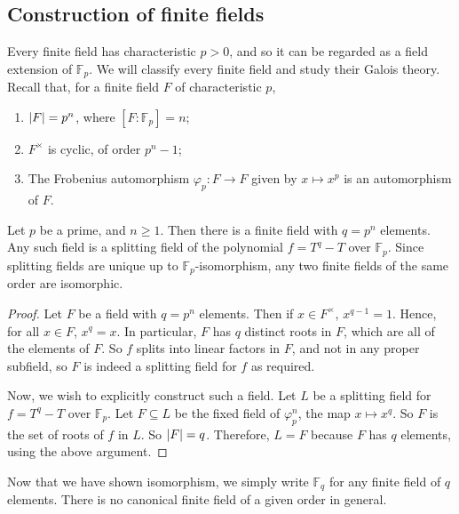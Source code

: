 \subsection{Construction of finite fields}
Every finite field has characteristic \( p > 0 \), and so it can be regarded as a field extension of \( \mathbb F_p \).
We will classify every finite field and study their Galois theory.
Recall that, for a finite field \( F \) of characteristic \( p \),
\begin{enumerate}
	\item \( \abs{F} = p^n \), where \( [F : \mathbb F_p] = n \);
	\item \( F^\times \) is cyclic, of order \( p^n - 1 \);
	\item The Frobenius automorphism \( \varphi_p \colon F \to F \) given by \( x \mapsto x^p \) is an automorphism of \( F \).
\end{enumerate}
\begin{theorem}
	Let \( p \) be a prime, and \( n \geq 1 \).
	Then there is a finite field with \( q = p^n \) elements.
	Any such field is a splitting field of the polynomial \( f = T^q - T \) over \( \mathbb F_p \).
	Since splitting fields are unique up to \( \mathbb F_p \)-isomorphism, any two finite fields of the same order are isomorphic.
\end{theorem}
\begin{proof}
	Let \( F \) be a field with \( q = p^n \) elements.
	Then if \( x \in F^\times \), \( x^{q-1} = 1 \).
	Hence, for all \( x \in F \), \( x^q = x \).
	In particular, \( F \) has \( q \) distinct roots in \( F \), which are all of the elements of \( F \).
	So \( f \) splits into linear factors in \( F \), and not in any proper subfield, so \( F \) is indeed a splitting field for \( f \) as required.

	Now, we wish to explicitly construct such a field.
	Let \( L \) be a splitting field for \( f = T^q - T \) over \( \mathbb F_p \).
	Let \( F \subseteq L \) be the fixed field of \( \varphi_p^n \), the map \( x \mapsto x^q \).
	So \( F \) is the set of roots of \( f \) in \( L \).
	So \( \abs{F} = q \).
	Therefore, \( L = F \) because \( F \) has \( q \) elements, using the above argument.
\end{proof}
Now that we have shown isomorphism, we simply write \( \mathbb F_q \) for any finite field of \( q \) elements.
There is no canonical finite field of a given order in general.

